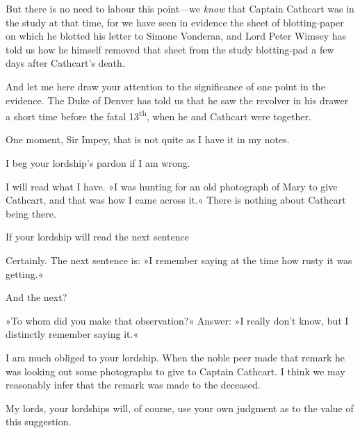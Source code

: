 \begin{dialogue}
\smallskip 

But there is no need to labour this point—we \textit{know} that Captain Cathcart was in the study at that time, for we have seen in evidence the sheet of blotting-paper on which he blotted his letter to Simone Vonderaa, and Lord Peter Wimsey has told us how he himself removed that sheet from the study blotting-pad a few days after Cathcart's death.

\smallskip 

And let me here draw your attention to the significance of one point in the evidence. The Duke of Denver has told us that he saw the revolver in his drawer a short time before the fatal 13\textsuperscript{th}, when he and Cathcart were together.


 One moment, Sir Impey, that is not quite as I have it in my notes.

 I beg your lordship's pardon if I am wrong.

 I will read what I have. »I was hunting for an old photograph of Mary to give Cathcart, and that was how I came across it.« There is nothing about Cathcart being there.

 If your lordship will read the next sentence\longdash

 Certainly. The next sentence is: »I remember saying at the time how rusty it was getting.«

 And the next?

 »To whom did you make that observation?« Answer: »I really don't know, but I distinctly remember saying it.«

 I am much obliged to your lordship. When the noble peer made that remark he was looking out some photographs to give to Captain Cathcart. I think we may reasonably infer that the remark was made to the deceased.

  My lords, your lordships will, of course, use your own judgment as to the value of this suggestion.


\end{dialogue}
